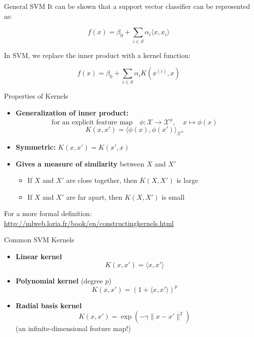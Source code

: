 \begin{frame}{General SVM}
    It can be shown that a support vector classifier can be represented as:

    \[
    f(x) = \beta_0 + \sum_{i \in S} \alpha_i \langle x, x_i \rangle
    \]

    \vspace{0.6cm}

    In SVM, we replace the inner product with a kernel function:

    \[
    f(x) = \beta_0 + \sum_{i \in S} \alpha_i K\left(x^{(i)}, x\right)
    \]
\end{frame}

\begin{frame}{Properties of Kernels}
    \begin{itemize}
        \item \textbf{Generalization of inner product:}
        \[
        \text{for an explicit feature map} \quad \phi : \mathcal{X} \rightarrow \mathcal{X}^\phi, \quad x \mapsto \phi(x)
        \]
        \[
        K(x, x') = \langle \phi(x), \phi(x') \rangle_{\mathcal{X}^\phi}
        \]

        \item \textbf{Symmetric:} \quad $K(x, x') = K(x', x)$

        \item \textbf{Gives a measure of similarity} between $X$ and $X'$
        \begin{itemize}
            \item If $X$ and $X'$ are close together, then $K(X, X')$ is large
            \item If $X$ and $X'$ are far apart, then $K(X, X')$ is small
        \end{itemize}
    \end{itemize}

    {\tiny For a more formal definition: \url{http://mlweb.loria.fr/book/en/constructingkernels.html}}
\end{frame}


\begin{frame}{Common SVM Kernels}
    \begin{itemize}
        \item \textbf{Linear kernel}
        \[
        K(x, x') = \langle x, x' \rangle
        \]

        \item \textbf{Polynomial kernel} (degree $p$)
        \[
        K(x, x') = (1 + \langle x, x' \rangle)^p
        \]

        \item \textbf{Radial basis kernel}
        \[
        K(x, x') = \exp\left(-\gamma \|x - x'\|^2\right)
        \]
        {\scriptsize (an infinite-dimensional feature map!)}
    \end{itemize}
\end{frame}

